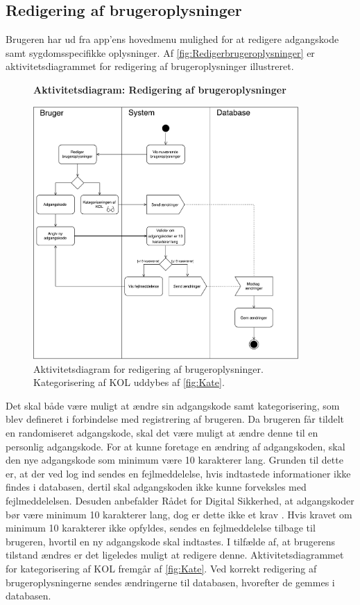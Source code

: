\subsection*{Redigering af brugeroplysninger} \label{sec:redigrering}
Brugeren har ud fra app'ens hovedmenu mulighed for at redigere adgangskode samt sygdomsspecifikke oplysninger. Af \autoref{fig:Redigerbrugeroplysninger} er aktivitetsdiagrammet for redigering af brugeroplysninger illustreret. 

\begin{figure}[H]
\centering
\textbf{Aktivitetsdiagram: Redigering af brugeroplysninger}\par\medskip
\includegraphics[width=0.9\textwidth]{figures/aktivitetsdiagram/Redigerbrugeroplysninger}
\caption{Aktivitetsdiagram for redigering af brugeroplysninger. Kategorisering af KOL uddybes af \autoref{fig:Kate}.}
\label{fig:Redigerbrugeroplysninger}
\end{figure}

\noindent
Det skal både være muligt at ændre sin adgangskode samt kategorisering, som blev defineret i forbindelse med registrering af brugeren. Da brugeren får tildelt en randomiseret adgangskode, skal det være muligt at ændre denne til en personlig adgangskode. For at kunne foretage en ændring af adgangskoden, skal den nye adgangskode som minimum være 10 karakterer lang. Grunden til dette er, at der ved log ind sendes en fejlmeddelelse, hvis indtastede informationer ikke findes i databasen, dertil skal adgangskoden ikke kunne forveksles med fejlmeddelelsen. Desuden anbefalder Rådet for Digital Sikkerhed, at adgangskoder bør være minimum 10 karakterer lang, dog er dette ikke et krav \citep{sikkerhed2015}.
Hvis kravet om minimum 10 karakterer ikke opfyldes, sendes en fejlmeddelelse tilbage til brugeren, hvortil en ny adgangskode skal indtastes. 
I tilfælde af, at brugerens tilstand ændres er det ligeledes muligt at redigere denne. Aktivitetsdiagrammet for kategorisering af KOL fremgår af \autoref{fig:Kate}.
Ved korrekt redigering af brugeroplysningerne sendes ændringerne til databasen, hvorefter de gemmes i databasen.